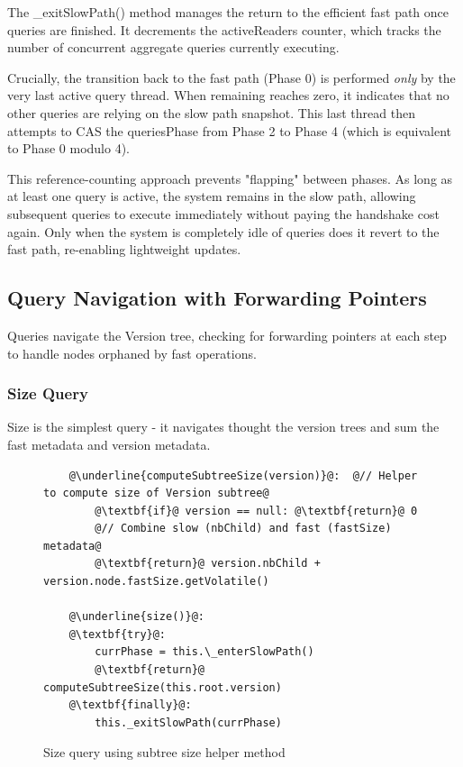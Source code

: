 \documentclass[acmsmall,screen,nonacm]{acmart}
\newcommand{\codestyle}[1]{{{\fontsize{9}{10}\ttfamily #1}}}
\begin{document}
The \codestyle{\_exitSlowPath()} method manages the return to the efficient fast path once queries are finished. It decrements the \codestyle{activeReaders} counter, which tracks the number of concurrent aggregate queries currently executing.

Crucially, the transition back to the fast path (Phase 0) is performed \textit{only} by the very last active query thread. When \codestyle{remaining} reaches zero, it indicates that no other queries are relying on the slow path snapshot. This last thread then attempts to CAS the \codestyle{queriesPhase} from Phase 2 to Phase 4 (which is equivalent to Phase 0 modulo 4).

This reference-counting approach prevents "flapping" between phases. As long as at least one query is active, the system remains in the slow path, allowing subsequent queries to execute immediately without paying the handshake cost again. Only when the system is completely idle of queries does it revert to the fast path, re-enabling lightweight updates.

\subsection{Query Navigation with Forwarding Pointers}

Queries navigate the Version tree, checking for forwarding pointers at each step to handle nodes orphaned by fast operations.

\subsubsection{Size Query}

Size is the simplest query - it navigates thought the version trees and sum the fast metadata and version metadata.

\begin{figure}[H]
\begin{lstlisting}
    @\underline{computeSubtreeSize(version)}@:  @// Helper to compute size of Version subtree@
        @\textbf{if}@ version == null: @\textbf{return}@ 0
        @// Combine slow (nbChild) and fast (fastSize) metadata@
        @\textbf{return}@ version.nbChild + version.node.fastSize.getVolatile()
    
    @\underline{size()}@:
    @\textbf{try}@:
        currPhase = this.\_enterSlowPath()
        @\textbf{return}@ computeSubtreeSize(this.root.version)
    @\textbf{finally}@:
        this._exitSlowPath(currPhase)
\end{lstlisting}
\caption{Size query using subtree size helper method}
\label{fig:size-with-helper}
\end{figure}
\end{document}
